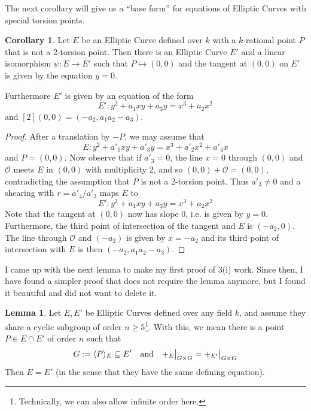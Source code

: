 \documentclass{scrartcl}
\renewcommand{\O}{\mathcal{O}}
\newcommand\restr[2]{{
    \left.\kern-\nulldelimiterspace
    #1
    \vphantom{\big|}
    \right|_{#2}
}}
\theoremstyle{definition}
\newtheorem{lemma}[subsection]{Lemma}
\newtheorem{corollary}[subsection]{Corollary}
\begin{document}
The next corollary will give us a ``base form'' for equations of Elliptic Curves with special torsion points. 
\begin{corollary}
    \label{prop:point_normalization}
    Let $E$ be an Elliptic Curve defined over $k$ with a $k$-rational point $P$ that is not a 2-torsion point.
    Then there is an Elliptic Curve $E'$ and a linear isomorphism $\psi: E \to E'$ such that $P \mapsto (0, 0)$ and the tangent at $(0, 0)$ on $E'$ is given by the equation $y = 0$.
    
    Furthermore $E'$ is given by an equation of the form
    \begin{equation*}
        E': y^2 + a_1 x y + a_3 y = x^3 + a_2 x^2
    \end{equation*}
    and $[2](0, 0) = (-a_2, a_1 a_2 - a_3)$.
\end{corollary}
\begin{proof}
    After a translation by $-P$, we may assume that
    \begin{equation*}
        E: y^2 + a'_1 x y + a'_3 y = x^3 + a'_2 x^2 + a'_4 x
    \end{equation*}
    and $P = (0, 0)$.
    Now observe that if $a'_3 = 0$, the line $x = 0$ through $(0, 0)$ and $\O$ meets $E$ in $(0, 0)$ with multiplicity 2, and so $(0, 0) + \O = (0, 0)$, contradicting the assumption that $P$ is not a 2-torsion point.
    Thus $a'_3 \neq 0$ and a shearing with $r = a'_4 / a'_3$ maps $E$ to
    \begin{equation*}
        E': y^2 + a_1 x y + a_3 y = x^3 + a_2 x^2
    \end{equation*}
    Note that the tangent at $(0, 0)$ now has slope $0$, i.e. is given by $y = 0$.
    Furthermore, the third point of intersection of the tangent and $E$ is $(-a_2, 0)$.
    The line through $\O$ and $(-a_2)$ is given by $x = -a_2$ and its third point of intersection with $E$ is then $(-a_2, a_1a_2 - a_3)$. 
\end{proof}
I came up with the next lemma to make my first proof of 3(i) work.
Since then, I have found a simpler proof that does not require the lemma anymore, but I found it beautiful and did not want to delete it.
\begin{lemma}
    \label{prop:share_subgroup_equal}
    Let $E, E'$ be Elliptic Curves defined over any field $k$, and assume they share a cyclic subgroup of order $n \geq 5$\footnote{Technically, we can also allow infinite order here.}.
    With this, we mean there is a point $P \in E \cap E'$ of order $n$ such that
    \begin{equation*}
        G := \langle P \rangle_E \subseteq E' \quad \text{and} \quad \restr{+_E}{G \times G} = \restr{+_{E'}}{G \times G}
    \end{equation*}
    Then $E = E'$ (in the sense that they have the same defining equation).
\end{lemma}
\end{document}
